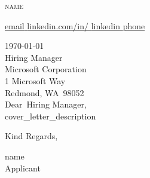 \documentclass[12pt]{letter}
\makeatletter
\newcommand{\myname}{ {{name}} } %
\newcommand{\mytitle}{Applicant} %
\newcommand{\myemail}{ {{email}} } %
\newcommand{\mylinkedin}{ {{linkedin}} } %
\newcommand{\myphone}{ {{phone}} } %
\newcommand{\recipient}{Hiring Manager} %
\newcommand{\greeting}{Dear} %
\newcommand{\closer}{Kind Regards} %
\newcommand{\company}{Microsoft Corporation} %
\newcommand{\street}{1 Microsoft Way} %
\newcommand{\city}{Redmond} %
\newcommand{\state}{WA} %
\newcommand{\zip}{98052} %
\makeatother
\begin{document}
\AddToShipoutPictureBG{
\color{ gr}
\AtPageUpperLeft{\rule[-1.3in]{\paperwidth}{1.3in}}
}

\begin{center}
{\fontsize{28}{0}\selectfont\scshape \myname}

\href{mailto:\myemail}{\faEnvelope\enspace \myemail}\hfill
\href{https://linkedin.com/in/\mylinkedin}{\faLinkedinIn\enspace linkedin.com/in/\mylinkedin}\hfill
\href{tel:\myphone}{\faPhone\enspace \myphone}\hfill

\end{center}

\vspace{0.2in}

\today\\

\vspace{-0.1in}\recipient\\
\company\\
\street\\
\city, \state\ \zip\\

\vspace{-0.1in}\greeting\ \recipient,\\

\vspace{-0.1in}\setlength\parindent{24pt}
\noindent
{{cover_letter_description}}

\vspace{0.1in}
\vfill

\begin{flushright}
\closer,



\myname 
\\[5pt]
\mytitle
\end{flushright}
\end{document}

